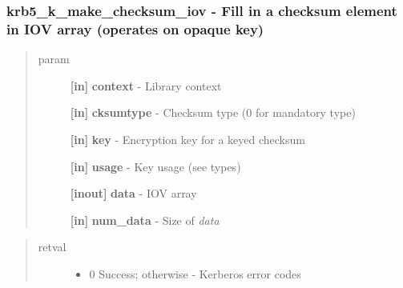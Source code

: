 \documentclass[letterpaper,10pt,english]{sphinxmanual}
\begin{document}
\subsubsection{krb5\_k\_make\_checksum\_iov -  Fill in a checksum element in IOV array (operates on opaque key)}
\label{appdev/refs/api/krb5_k_make_checksum_iov::doc}\label{appdev/refs/api/krb5_k_make_checksum_iov:krb5-k-make-checksum-iov-fill-in-a-checksum-element-in-iov-array-operates-on-opaque-key}

\begin{fulllineitems}
\label{appdev/refs/api/krb5_k_make_checksum_iov:c.krb5_k_make_checksum_iov}
\end{fulllineitems}

\begin{quote}\begin{description}
\item[{param}] \leavevmode
\textbf{{[}in{]}} \textbf{context} - Library context

\textbf{{[}in{]}} \textbf{cksumtype} - Checksum type (0 for mandatory type)

\textbf{{[}in{]}} \textbf{key} - Encryption key for a keyed checksum

\textbf{{[}in{]}} \textbf{usage} - Key usage (see  types)

\textbf{{[}inout{]}} \textbf{data} - IOV array

\textbf{{[}in{]}} \textbf{num\_data} - Size of \emph{data}

\end{description}\end{quote}
\begin{quote}\begin{description}
\item[{retval}] \leavevmode\begin{itemize}
\item {} 
0   Success; otherwise - Kerberos error codes

\end{itemize}

\end{description}\end{quote}
\end{document}
